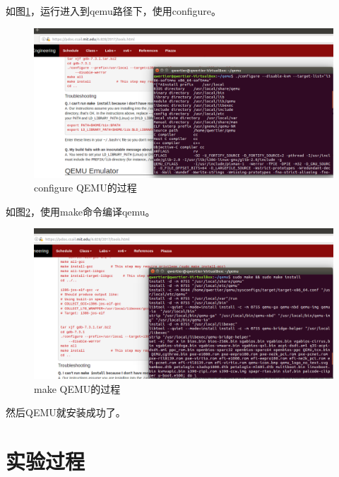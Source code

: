 \documentclass[forprint]{WHUBachelor}
\begin{document}
如图\ref{fig:prep:qemu_config}，运行进入到qemu路径下，使用configure。


\begin{figure}[H]
  \centering
  \includegraphics[width=6in]{figures/prep/qemu_config.png}
  \caption{configure QEMU的过程}\label{fig:prep:qemu_config}
\end{figure}

如图\ref{fig:prep:qemu_make}，使用make命令编译qemu。


\begin{figure}[H]
  \centering
  \includegraphics[width=6in]{figures/prep/qemu_make.png}
  \caption{make QEMU的过程}\label{fig:prep:qemu_make}
\end{figure}

然后QEMU就安装成功了。

\chapter{实验过程}


\end{document}
